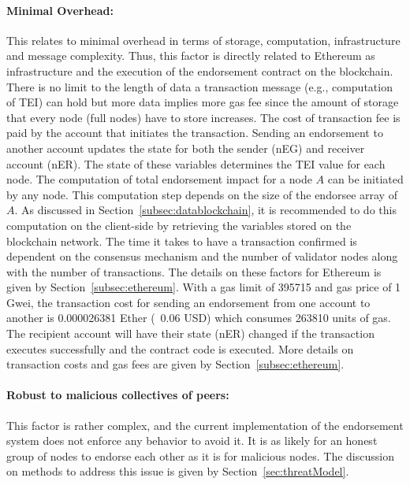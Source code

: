 \paragraph{Minimal Overhead:}This relates to minimal overhead in terms of
storage, computation, infrastructure and message complexity. Thus, this factor
is directly related to Ethereum as infrastructure and the execution of the
endorsement contract on the blockchain. There is no limit to the length of data
a transaction message (e.g., computation of \ac{TEI}) can hold but more data
implies more gas fee since the amount of storage that every node (full nodes)
have to store increases. The cost of transaction fee is paid by the account
that initiates the transaction. Sending an endorsement to another account
updates the state for both the sender (\ac{nEG}) and receiver account
(\ac{nER}). The state of these variables determines the \ac{TEI} value for each
node. The computation of total endorsement impact for a node $A$ can be
initiated by any node. This computation step depends on the size of the
endorsee array of $A$. As discussed in Section~\ref{subsec:datablockchain}, it
is recommended to do this computation on the client-side by retrieving the
variables stored on the blockchain network. The time it takes to have a
transaction confirmed is dependent on the consensus mechanism and the number of
validator nodes along with the number of transactions. The details on these
factors for Ethereum is given by Section~\ref{subsec:ethereum}. With a gas
limit of 395715 and gas price of 1 Gwei, the transaction cost for sending an
endorsement from one account to another is 0.000026381 Ether (~0.06 USD) which
consumes 263810 units of gas. The recipient account will have their state
(\ac{nER}) changed if the transaction executes successfully and the contract
code is executed. More details on transaction costs and gas fees are given by
Section~\ref{subsec:ethereum}. 
\paragraph{Robust to malicious collectives of peers:}This factor is rather
complex, and the current implementation of the endorsement system does not
enforce any behavior to avoid it. It is as likely for an honest group of nodes
to endorse each other as it is for malicious nodes. The discussion on methods
to address this issue is given by Section~\ref{sec:threatModel}. 

